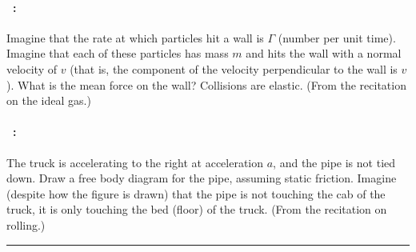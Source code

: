 \documentclass[12pt]{article} 
\begin{document}
\vfill

\paragraph{\problemname~\theproblem:}%
Imagine that the rate at which particles hit a wall is $\Gamma$
(number per unit time).  Imagine that each of these particles has mass
$m$ and hits the wall with a normal velocity of $v$ (that is, the
component of the velocity perpendicular to the wall is $v$). What is
the mean force on the wall? Collisions are elastic. (From the
recitation on the ideal gas.)

\vfill

\paragraph{\problemname~\theproblem:}%
The truck is accelerating to the right at acceleration $a$, and the
pipe is not tied down. Draw a free body diagram for the pipe, assuming static friction. Imagine
(despite how the figure is drawn) that the pipe is not touching the
cab of the truck, it is only touching the bed (floor) of the truck. (From the
recitation on rolling.)\\ \rule{0.3\textwidth}{0pt}

\vfill
~
\end{document}
